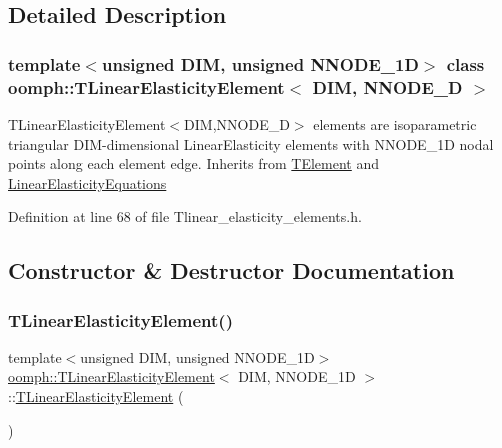 \subsection{Detailed Description}
\subsubsection*{template$<$unsigned D\+IM, unsigned N\+N\+O\+D\+E\+\_\+1D$>$\newline
class oomph\+::\+T\+Linear\+Elasticity\+Element$<$ D\+I\+M, N\+N\+O\+D\+E\+\_\+D $>$}

T\+Linear\+Elasticity\+Element$<$\+D\+I\+M,\+N\+N\+O\+D\+E\+\_\+D$>$ elements are isoparametric triangular D\+I\+M-\/dimensional Linear\+Elasticity elements with N\+N\+O\+D\+E\+\_\+1D nodal points along each element edge. Inherits from \hyperlink{classoomph_1_1TElement}{T\+Element} and \hyperlink{classoomph_1_1LinearElasticityEquations}{Linear\+Elasticity\+Equations} 

Definition at line 68 of file Tlinear\+\_\+elasticity\+\_\+elements.\+h.



\subsection{Constructor \& Destructor Documentation}
\mbox{\label{classoomph_1_1TLinearElasticityElement_aebc7da4cf8438d0eb792f9338c6b664a}} 
\subsubsection{\texorpdfstring{T\+Linear\+Elasticity\+Element()}{TLinearElasticityElement()}\hspace{0.1cm}{\footnotesize\ttfamily [1/2]}}
{\footnotesize\ttfamily template$<$unsigned D\+IM, unsigned N\+N\+O\+D\+E\+\_\+1D$>$ \\
\hyperlink{classoomph_1_1TLinearElasticityElement}{oomph\+::\+T\+Linear\+Elasticity\+Element}$<$ D\+IM, N\+N\+O\+D\+E\+\_\+1D $>$\+::\hyperlink{classoomph_1_1TLinearElasticityElement}{T\+Linear\+Elasticity\+Element} (\begin{DoxyParamCaption}{ }\end{DoxyParamCaption})\hspace{0.3cm}{\ttfamily [inline]}}



